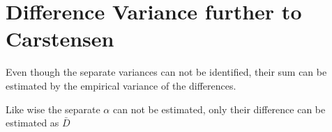 \documentclass[12pt, a4paper]{report}
\theoremstyle{plain}
\theoremstyle{definition}
\theoremstyle{remark}
\begin{document}
%
%
























\section{Difference Variance further to Carstensen}






Even though the separate variances can not be identified, their sum can be estimated by the empirical variance of the differences.

Like wise the separate $\alpha$ can not be
estimated, only their difference can be estimated as
$\bar{D}$
\end{document}
